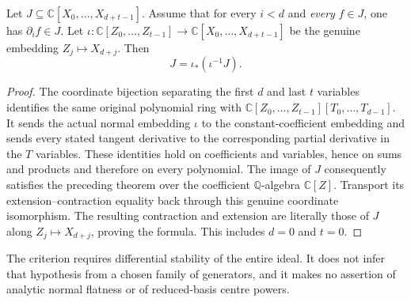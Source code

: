 \begin{theorem}
\label{hir:differential-stable-normal-polynomial-cylinder}
\leanok
Let $J\subseteq\mathbb C[X_0,\ldots,X_{d+t-1}]$. Assume that for every
$i<d$ and \emph{every} $f\in J$, one has $\partial_i f\in J$.
Let $\iota:\mathbb C[Z_0,\ldots,Z_{t-1}]\longrightarrow
\mathbb C[X_0,\ldots,X_{d+t-1}]$ be the genuine embedding
$Z_j\mapsto X_{d+j}$. Then
\[
 J=\iota_*(\iota^{-1}J).
\]
\end{theorem}
\begin{proof}
The coordinate bijection separating the first $d$ and last $t$ variables
identifies the same original polynomial ring with
$\mathbb C[Z_0,\ldots,Z_{t-1}][T_0,\ldots,T_{d-1}]$.
It sends the actual normal embedding $\iota$ to the constant-coefficient
embedding and sends every stated tangent derivative to the corresponding
partial derivative in the $T$ variables. These identities hold on
coefficients and variables, hence on sums and products and therefore on
every polynomial. The image of $J$ consequently satisfies the preceding
theorem over the coefficient $\mathbb Q$-algebra $\mathbb C[Z]$.
Transport its extension--contraction equality back through this genuine
coordinate isomorphism. The resulting contraction and extension are
literally those of $J$ along $Z_j\mapsto X_{d+j}$, proving the formula.
This includes $d=0$ and $t=0$.
\end{proof}

The criterion requires differential stability of the entire ideal. It does
not infer that hypothesis from a chosen family of generators, and it makes
no assertion of analytic normal flatness or of reduced-basis centre powers.
